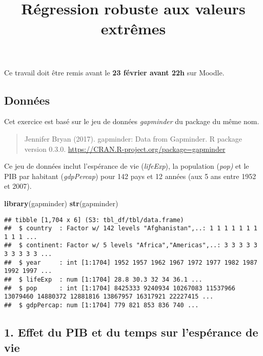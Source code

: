 \documentclass[
]{article}
\title{Régression robuste aux valeurs extrêmes}
\author{}
\date{\vspace{-2.5em}}
\newenvironment{Shaded}{\begin{snugshade}}{\end{snugshade}}
\newcommand{\FunctionTok}[1]{\textcolor[rgb]{0.13,0.29,0.53}{\textbf{#1}}}
\newcommand{\NormalTok}[1]{#1}
\begin{document}
\maketitle

Ce travail doit être remis avant le \textbf{23 février avant 22h} sur
Moodle.

\hypertarget{donnuxe9es}{%
\subsection{Données}\label{donnuxe9es}}

Cet exercice est basé sur le jeu de données \emph{gapminder} du package
du même nom.

\begin{quote}
Jennifer Bryan (2017). gapminder: Data from Gapminder. R package version
0.3.0. \url{https://CRAN.R-project.org/package=gapminder}
\end{quote}

Ce jeu de données inclut l'espérance de vie (\emph{lifeExp}), la
population (\emph{pop)} et le PIB par habitant (\emph{gdpPercap}) pour
142 pays et 12 années (aux 5 ans entre 1952 et 2007).

\begin{Shaded}
\begin{Highlighting}[]
\FunctionTok{library}\NormalTok{(gapminder)}
\FunctionTok{str}\NormalTok{(gapminder)}
\end{Highlighting}
\end{Shaded}

\begin{verbatim}
## tibble [1,704 x 6] (S3: tbl_df/tbl/data.frame)
##  $ country  : Factor w/ 142 levels "Afghanistan",..: 1 1 1 1 1 1 1 1 1 1 ...
##  $ continent: Factor w/ 5 levels "Africa","Americas",..: 3 3 3 3 3 3 3 3 3 3 ...
##  $ year     : int [1:1704] 1952 1957 1962 1967 1972 1977 1982 1987 1992 1997 ...
##  $ lifeExp  : num [1:1704] 28.8 30.3 32 34 36.1 ...
##  $ pop      : int [1:1704] 8425333 9240934 10267083 11537966 13079460 14880372 12881816 13867957 16317921 22227415 ...
##  $ gdpPercap: num [1:1704] 779 821 853 836 740 ...
\end{verbatim}

\hypertarget{effet-du-pib-et-du-temps-sur-lespuxe9rance-de-vie}{%
\subsection{1. Effet du PIB et du temps sur l'espérance de
vie}\label{effet-du-pib-et-du-temps-sur-lespuxe9rance-de-vie}}
\end{document}
